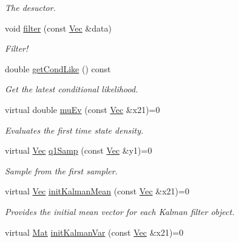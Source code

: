 \begin{DoxyCompactItemize}
\begin{DoxyCompactList}\small\item\em The desuctor. \end{DoxyCompactList}\item 
void \hyperlink{classKalman__RBPF_a72d5ed61d0289a6977bf178145f5b969}{filter} (const \hyperlink{pmfs_8h_a4c7df05c6f5e8a0d15ae14bcdbc07152}{Vec} \&data)
\begin{DoxyCompactList}\small\item\em Filter! \end{DoxyCompactList}\item 
double \hyperlink{classKalman__RBPF_a2d65ffce3d115ecaf1c8e97b9222cdde}{get\+Cond\+Like} () const 
\begin{DoxyCompactList}\small\item\em Get the latest conditional likelihood. \end{DoxyCompactList}\item 
virtual double \hyperlink{classKalman__RBPF_a25e8682d13a04eb1075a4d30dfa6825a}{mu\+Ev} (const \hyperlink{pmfs_8h_a4c7df05c6f5e8a0d15ae14bcdbc07152}{Vec} \&x21)=0
\begin{DoxyCompactList}\small\item\em Evaluates the first time state density. \end{DoxyCompactList}\item 
virtual \hyperlink{pmfs_8h_a4c7df05c6f5e8a0d15ae14bcdbc07152}{Vec} \hyperlink{classKalman__RBPF_a71e394c093f606f80a92a3fc4fe087a3}{q1\+Samp} (const \hyperlink{pmfs_8h_a4c7df05c6f5e8a0d15ae14bcdbc07152}{Vec} \&y1)=0
\begin{DoxyCompactList}\small\item\em Sample from the first sampler. \end{DoxyCompactList}\item 
virtual \hyperlink{pmfs_8h_a4c7df05c6f5e8a0d15ae14bcdbc07152}{Vec} \hyperlink{classKalman__RBPF_a870a53fc149adf8042fa12eb5d9a8d30}{init\+Kalman\+Mean} (const \hyperlink{pmfs_8h_a4c7df05c6f5e8a0d15ae14bcdbc07152}{Vec} \&x21)=0
\begin{DoxyCompactList}\small\item\em Provides the initial mean vector for each Kalman filter object. \end{DoxyCompactList}\item 
virtual \hyperlink{pmfs_8h_ae601f56a556993079f730483c574356f}{Mat} \hyperlink{classKalman__RBPF_a4f7f37a90d9382ca2ad7dfef4acf1bc0}{init\+Kalman\+Var} (const \hyperlink{pmfs_8h_a4c7df05c6f5e8a0d15ae14bcdbc07152}{Vec} \&x21)=0

\end{DoxyCompactItemize}
